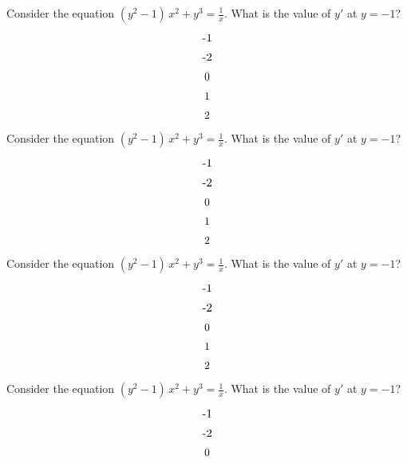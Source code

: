 \documentclass[amsfonts,bezier,leqno,fleqn,12pt,a4paper]{article}
\def \v2{\vspace {3.5cm}}
\def \be{\begin{equation}}
\def \ee{\end{equation}}
\renewcommand{\sc}{\vspace {0.3in} \setcounter{equation}{0}}
\begin{document}
\begin{large}
\item %
Consider the equation $\displaystyle (y^2-1)\,x^2+y^3=\frac{1}{x}.$ What is the value of $y'$ at $y=-1$?
\sc

			\be
			$-1$
			\ee
		
			\be
			$-2$
			\ee
		
			\be
			$0$
			\ee
		
			\be
			$1$
			\ee
		
			\be
			$2$
			\ee
		
\newpage

\item %
Consider the equation $\displaystyle (y^2-1)\,x^2+y^3=\frac{1}{x}.$ What is the value of $y'$ at $y=-1$?
\sc

			\be
			$-1$
			\ee
		
			\be
			$-2$
			\ee
		
			\be
			$0$
			\ee
		
			\be
			$1$
			\ee
		
			\be
			$2$
			\ee
		
\v2

\item %
Consider the equation $\displaystyle (y^2-1)\,x^2+y^3=\frac{1}{x}.$ What is the value of $y'$ at $y=-1$?
\sc

			\be
			$-1$
			\ee
		
			\be
			$-2$
			\ee
		
			\be
			$0$
			\ee
		
			\be
			$1$
			\ee
		
			\be
			$2$
			\ee
		
\newpage

\item %
Consider the equation $\displaystyle (y^2-1)\,x^2+y^3=\frac{1}{x}.$ What is the value of $y'$ at $y=-1$?
\sc

			\be
			$-1$
			\ee
		
			\be
			$-2$
			\ee
		
			\be
			$0$
			\ee
		

\end{large}
\end{document}
